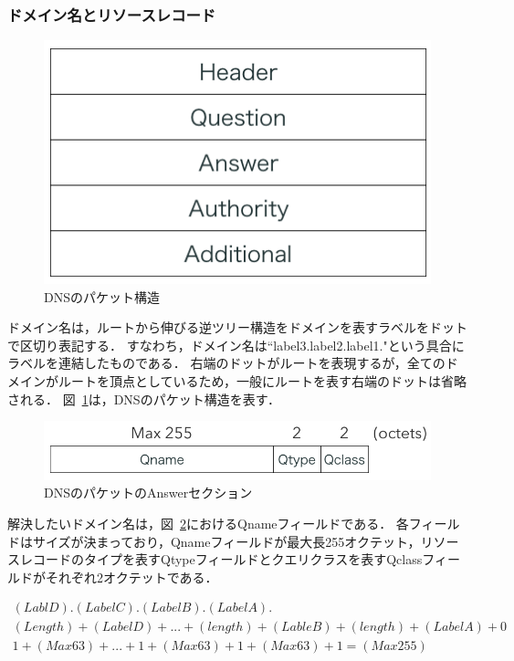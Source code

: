 
\subsubsection{ドメイン名とリソースレコード}
\begin{figure}[h]
 \centering
 \includegraphics[scale=0.7]{figure/dns-format.png}
 \caption{DNSのパケット構造}
 \label{fig:dns-format}
\end{figure}

ドメイン名は，ルートから伸びる逆ツリー構造をドメインを表すラベルをドットで区切り表記する．
すなわち，ドメイン名は``label3.label2.label1."という具合にラベルを連結したものである．
右端のドットがルートを表現するが，全てのドメインがルートを頂点としているため，一般にルートを表す右端のドットは省略される．
図~\ref{fig:dns-format}は，DNSのパケット構造を表す．

\begin{figure}[h]
 \centering
 \includegraphics[scale=0.6]{figure/dns-answer.png}
 \caption{DNSのパケットのAnswerセクション}
 \label{fig:dns-answer}
\end{figure}

解決したいドメイン名は，図~\ref{fig:dns-answer}におけるQnameフィールドである．
各フィールドはサイズが決まっており，Qnameフィールドが最大長255オクテット，リソースレコードのタイプを表すQtypeフィールドとクエリクラスを表すQclassフィールドがそれぞれ2オクテットである．

\begin{eqnarray}
 (LablD).(LabelC).(LabelB).(LabelA). \label{eq:domain-name} \\
 (Length) + (LabelD) + ... + (length) + (LableB) + (length) + (LabelA) + 0 \label{eq:label-name} \\ 
 1 + (Max 63) + ... + 1 + (Max 63) + 1 + (Max 63) + 1 = (Max 255) \label{eq:length-label-domain}
\end{eqnarray}

